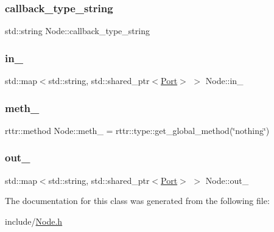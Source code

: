 \subsubsection{\texorpdfstring{callback\+\_\+type\+\_\+string}{callback\_type\_string}}
{\footnotesize\ttfamily std\+::string Node\+::callback\+\_\+type\+\_\+string\hspace{0.3cm}{\ttfamily [protected]}}

\mbox{\label{class_node_a2970ced9f376dd6c5d512d0bbb7cbb54}} 
\subsubsection{\texorpdfstring{in\+\_\+}{in\_}}
{\footnotesize\ttfamily std\+::map$<$std\+::string, std\+::shared\+\_\+ptr$<$\hyperlink{class_port}{Port}$>$ $>$ Node\+::in\+\_\+\hspace{0.3cm}{\ttfamily [protected]}}

\mbox{\label{class_node_a34e4ef7089672adaa8aa31277aa5f159}} 
\subsubsection{\texorpdfstring{meth\+\_\+}{meth\_}}
{\footnotesize\ttfamily rttr\+::method Node\+::meth\+\_\+ = rttr\+::type\+::get\+\_\+global\+\_\+method(\char`\"{}nothing\char`\"{})\hspace{0.3cm}{\ttfamily [protected]}}

\mbox{\label{class_node_a324497db3924989e08e8ee0411d5972e}} 
\subsubsection{\texorpdfstring{out\+\_\+}{out\_}}
{\footnotesize\ttfamily std\+::map$<$std\+::string, std\+::shared\+\_\+ptr$<$\hyperlink{class_port}{Port}$>$ $>$ Node\+::out\+\_\+\hspace{0.3cm}{\ttfamily [protected]}}



The documentation for this class was generated from the following file\+:\begin{DoxyCompactItemize}
\item 
include/\hyperlink{_node_8h}{Node.\+h}\end{DoxyCompactItemize}

